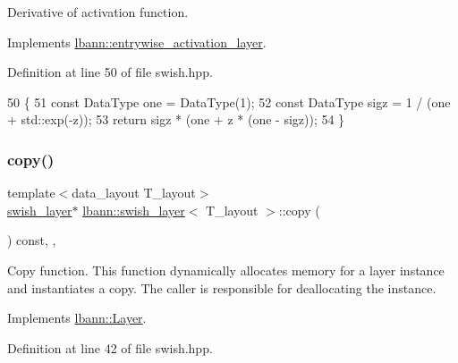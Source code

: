 Derivative of activation function. 

Implements \hyperlink{classlbann_1_1entrywise__activation__layer_a7676a4c5060452a38264993554e79f8e}{lbann\+::entrywise\+\_\+activation\+\_\+layer}.



Definition at line 50 of file swish.\+hpp.


\begin{DoxyCode}
50                                                             \{
51     \textcolor{keyword}{const} DataType one = DataType(1);
52     \textcolor{keyword}{const} DataType sigz = 1 / (one + std::exp(-z));
53     \textcolor{keywordflow}{return} sigz * (one + z * (one - sigz));
54   \}
\end{DoxyCode}
\mbox{\label{classlbann_1_1swish__layer_ad88f1660edf910883ab89ef66e4cf14d}} 
\subsubsection{\texorpdfstring{copy()}{copy()}}
{\footnotesize\ttfamily template$<$data\+\_\+layout T\+\_\+layout$>$ \\
\hyperlink{classlbann_1_1swish__layer}{swish\+\_\+layer}$\ast$ \hyperlink{classlbann_1_1swish__layer}{lbann\+::swish\+\_\+layer}$<$ T\+\_\+layout $>$\+::copy (\begin{DoxyParamCaption}{ }\end{DoxyParamCaption}) const\hspace{0.3cm}{\ttfamily [inline]}, {\ttfamily [override]}, {\ttfamily [virtual]}}

Copy function. This function dynamically allocates memory for a layer instance and instantiates a copy. The caller is responsible for deallocating the instance. 

Implements \hyperlink{classlbann_1_1Layer_af420f22bbac801c85483ade84588a23f}{lbann\+::\+Layer}.



Definition at line 42 of file swish.\+hpp.


